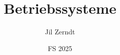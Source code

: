 \documentclass[a4paper, fontsize = 8pt, landscape]{scrartcl}
\title{Betriebssysteme}
\author{Jil Zerndt}
\date{FS 2025}
\begin{document}
\begin{multicols}{3}
	\thispagestyle{TitlePageStyle}
	\maketitle
	\sffamily
	
	\raggedcolumns
	\pagebreak
	
	\raggedcolumns
	\pagebreak
	
	\raggedcolumns
	\pagebreak
	
	\raggedcolumns
	\pagebreak
	
	\raggedcolumns
	\pagebreak
	
	\raggedcolumns
	\pagebreak
	
	\raggedcolumns
	\pagebreak
	
	\raggedcolumns
	\pagebreak
	
	\raggedcolumns
	\pagebreak
	
	\raggedcolumns
	\pagebreak
	
	\raggedcolumns
	\pagebreak
	
	\raggedcolumns
\end{multicols}
\end{document}
